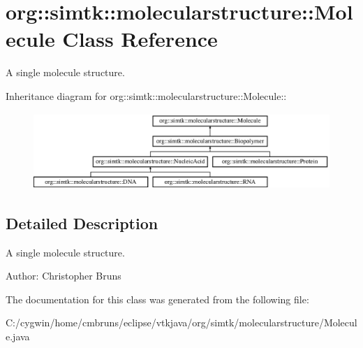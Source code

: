\section{org::simtk::molecularstructure::Molecule Class Reference}
\label{classorg_1_1simtk_1_1molecularstructure_1_1_molecule}
A single molecule structure.  


Inheritance diagram for org::simtk::molecularstructure::Molecule::\begin{figure}[H]
\begin{center}
\leavevmode
\includegraphics[height=2.89406cm]{classorg_1_1simtk_1_1molecularstructure_1_1_molecule}
\end{center}
\end{figure}


\subsection{Detailed Description}
A single molecule structure. 

\begin{Desc}
\item[Author:]Christopher Bruns \end{Desc}




The documentation for this class was generated from the following file:\begin{CompactItemize}
\item 
C:/cygwin/home/cmbruns/eclipse/vtkjava/org/simtk/molecularstructure/Molecule.java\end{CompactItemize}
